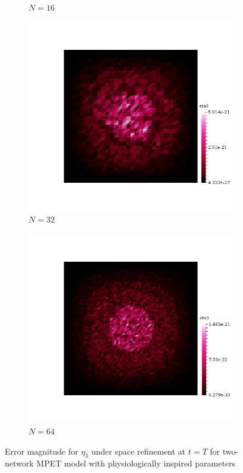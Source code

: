 \begin{figure}[h!]
\begin{subfigure}[b]{0.24\textwidth}
    \caption{$N=16$}
  \end{subfigure}
  \begin{subfigure}[b]{0.24\textwidth}
    \includegraphics[width=\textwidth,height=\textheight,keepaspectratio,height=\textheight,keepaspectratio]{figures/2_mpet/biomedical/space/eta3_32.png}
    \caption{$N=32$}
  \end{subfigure}
  \begin{subfigure}[b]{0.24\textwidth}
    \includegraphics[width=\textwidth,height=\textheight,keepaspectratio,height=\textheight,keepaspectratio]{figures/2_mpet/biomedical/space/eta3_64.png}
    \caption{$N=64$}
  \end{subfigure}
  \caption{Error magnitude for $\eta_3$ under space refinement at $t=T$ for two-network MPET model with physiologically inspired parameters} \label{fig:bb_bio_eta3}
\end{figure}
